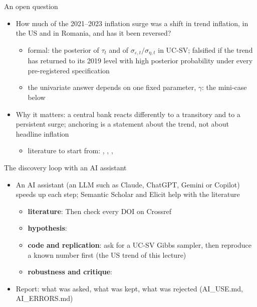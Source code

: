 \begin{frame}{An open question}
\itemsize{\small}
\begin{itemize}
    \item How much of the 2021--2023 inflation surge was a shift in trend inflation, in the US and in Romania, and has it been reversed?
    \begin{itemize}
        \item formal: the posterior of $\tau_t$ and of $\sigma_{\varepsilon,t}/\sigma_{\eta,t}$ in UC-SV; falsified if the trend has returned to its 2019 level with high posterior probability under every pre-registered specification
        \item the univariate answer depends on one fixed parameter, $\gamma$: the mini-case below
    \end{itemize}
    \item Why it matters: a central bank reacts differently to a transitory and to a persistent surge; anchoring is a statement about the trend, not about headline inflation
    \begin{itemize}
        \item literature to start from: , , , 
    \end{itemize}
\end{itemize}
\end{frame}

\begin{frame}{The discovery loop with an AI assistant}
\itemsize{\footnotesize}
\begin{itemize}
    \item An AI assistant (an LLM such as Claude, ChatGPT, Gemini or Copilot) speeds up each step; Semantic Scholar and Elicit help with the literature
    \begin{itemize}
        \item \textbf{literature}:  Then check every DOI on Crossref
        \item \textbf{hypothesis}: 
        \item \textbf{code and replication}: ask for a UC-SV Gibbs sampler, then reproduce a known number first (the US trend of this lecture)
        \item \textbf{robustness and critique}: 
    \end{itemize}
    \item Report: what was asked, what was kept, what was rejected (AI\_USE.md, AI\_ERRORS.md)
\end{itemize}
\end{frame}


